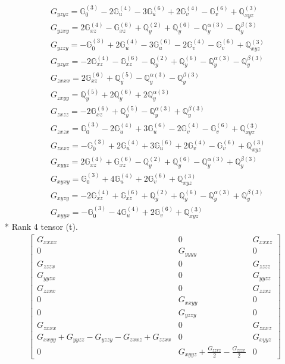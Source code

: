 \documentclass[fleqn,8pt,landscape]{jsarticle}
\begin{document}
\begin{align*}
& G_{yzyz} = \mathbb{G}_{0}^{(3)} - 2 \mathbb{G}_{u}^{(4)} - 3 \mathbb{G}_{u}^{(6)} + 2 \mathbb{G}_{v}^{(4)} - \mathbb{G}_{v}^{(6)} + \mathbb{Q}_{xyz}^{(3)} \\
& G_{yzxy} = 2 \mathbb{G}_{xz}^{(4)} - \mathbb{G}_{xz}^{(6)} + \mathbb{Q}_{y}^{(2)} + \mathbb{Q}_{y}^{(6)} - \mathbb{Q}_{y}^{\alpha(3)} - \mathbb{Q}_{y}^{\beta(3)} \\
& G_{yzzy} = - \mathbb{G}_{0}^{(3)} + 2 \mathbb{G}_{u}^{(4)} - 3 \mathbb{G}_{u}^{(6)} - 2 \mathbb{G}_{v}^{(4)} - \mathbb{G}_{v}^{(6)} + \mathbb{Q}_{xyz}^{(3)} \\
& G_{yzyx} = - 2 \mathbb{G}_{xz}^{(4)} - \mathbb{G}_{xz}^{(6)} - \mathbb{Q}_{y}^{(2)} + \mathbb{Q}_{y}^{(6)} - \mathbb{Q}_{y}^{\alpha(3)} - \mathbb{Q}_{y}^{\beta(3)} \\
& G_{zxxx} = 2 \mathbb{G}_{xz}^{(6)} + \mathbb{Q}_{y}^{(5)} - \mathbb{Q}_{y}^{\alpha(3)} - \mathbb{Q}_{y}^{\beta(3)} \\
& G_{zxyy} = \mathbb{Q}_{y}^{(5)} + 2 \mathbb{Q}_{y}^{(6)} + 2 \mathbb{Q}_{y}^{\alpha(3)} \\
& G_{zxzz} = - 2 \mathbb{G}_{xz}^{(6)} + \mathbb{Q}_{y}^{(5)} - \mathbb{Q}_{y}^{\alpha(3)} + \mathbb{Q}_{y}^{\beta(3)} \\
& G_{zxzx} = \mathbb{G}_{0}^{(3)} - 2 \mathbb{G}_{u}^{(4)} + 3 \mathbb{G}_{u}^{(6)} - 2 \mathbb{G}_{v}^{(4)} - \mathbb{G}_{v}^{(6)} + \mathbb{Q}_{xyz}^{(3)} \\
& G_{zxxz} = - \mathbb{G}_{0}^{(3)} + 2 \mathbb{G}_{u}^{(4)} + 3 \mathbb{G}_{u}^{(6)} + 2 \mathbb{G}_{v}^{(4)} - \mathbb{G}_{v}^{(6)} + \mathbb{Q}_{xyz}^{(3)} \\
& G_{xyyz} = 2 \mathbb{G}_{xz}^{(4)} + \mathbb{G}_{xz}^{(6)} - \mathbb{Q}_{y}^{(2)} + \mathbb{Q}_{y}^{(6)} - \mathbb{Q}_{y}^{\alpha(3)} + \mathbb{Q}_{y}^{\beta(3)} \\
& G_{xyxy} = \mathbb{G}_{0}^{(3)} + 4 \mathbb{G}_{u}^{(4)} + 2 \mathbb{G}_{v}^{(6)} + \mathbb{Q}_{xyz}^{(3)} \\
& G_{xyzy} = - 2 \mathbb{G}_{xz}^{(4)} + \mathbb{G}_{xz}^{(6)} + \mathbb{Q}_{y}^{(2)} + \mathbb{Q}_{y}^{(6)} - \mathbb{Q}_{y}^{\alpha(3)} + \mathbb{Q}_{y}^{\beta(3)} \\
& G_{xyyx} = - \mathbb{G}_{0}^{(3)} - 4 \mathbb{G}_{u}^{(4)} + 2 \mathbb{G}_{v}^{(6)} + \mathbb{Q}_{xyz}^{(3)}
\end{align*}
* Rank 4 tensor (t).
\begin{align*}
\begin{bmatrix} G_{xxxx} & 0 & G_{xxxz} \\ 0 & G_{yyyy} & 0 \\ G_{zzzx} & 0 & G_{zzzz} \\ G_{yyzx} & 0 & G_{yyzz} \\ G_{zzxx} & 0 & G_{zzxz} \\ 0 & G_{xxyy} & 0 \\ 0 & G_{yzzy} & 0 \\ G_{zxxx} & 0 & G_{zxxz} \\ G_{xxyy} + G_{yyzz} - G_{yzzy} - G_{zxxz} + G_{zzxx} & 0 & G_{xyyz} \\ 0 & G_{xyyz} + \frac{G_{zzxz}}{2} - \frac{G_{zzzx}}{2} & 0 \end{bmatrix}
\end{align*}
\end{document}
